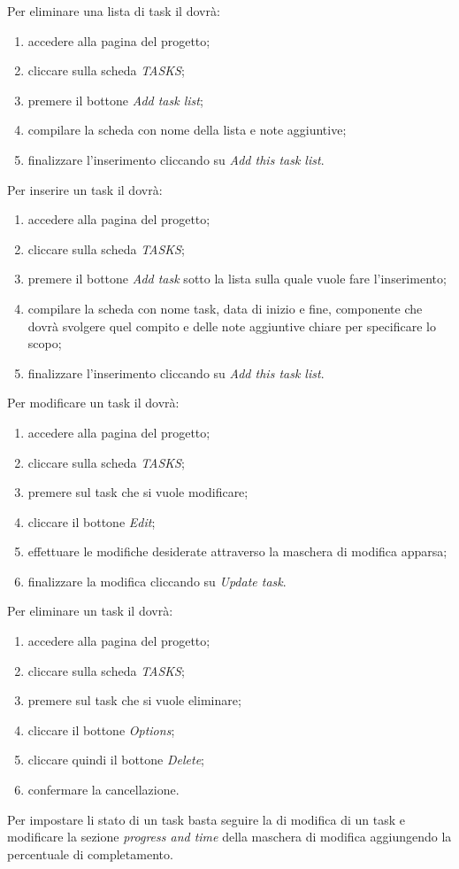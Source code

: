 			Per eliminare una lista di task il  dovrà:
			\begin{enumerate}
				\item accedere alla pagina del progetto;
				\item cliccare sulla scheda \textit{TASKS};
				\item premere il bottone \textit{Add task list};
				\item compilare la scheda con nome della lista e note aggiuntive;
				\item finalizzare l'inserimento cliccando su \textit{Add this task list}.
			\end{enumerate}
			
			Per inserire un task il  dovrà:
			\begin{enumerate}
				\item accedere alla pagina del progetto;
				\item cliccare sulla scheda \textit{TASKS};
				\item premere il bottone \textit{Add task} sotto la lista sulla quale vuole fare l'inserimento;
				\item compilare la scheda con nome task, data di inizio e fine, componente che dovrà svolgere quel compito e delle note aggiuntive chiare per specificare lo scopo;
				\item finalizzare l'inserimento cliccando su \textit{Add this task list}.
			\end{enumerate}
			
			Per modificare un task il  dovrà:
			\begin{enumerate}
				\item accedere alla pagina del progetto;
				\item cliccare sulla scheda \textit{TASKS};
				\item premere sul task che si vuole modificare;
				\item cliccare il bottone \textit{Edit};
				\item effettuare le modifiche desiderate attraverso la maschera di modifica apparsa;
				\item finalizzare la modifica cliccando su \textit{Update task}.
			\end{enumerate}
			
			Per eliminare un task il  dovrà:
			\begin{enumerate}
				\item accedere alla pagina del progetto;
				\item cliccare sulla scheda \textit{TASKS};
				\item premere sul task che si vuole eliminare;
				\item cliccare il bottone \textit{Options};
				\item cliccare quindi il bottone \textit{Delete};
				\item confermare la cancellazione.
			\end{enumerate}
			
			Per impostare li stato di un task basta  seguire la  di modifica di un task e modificare la sezione \textit{progress and time} della maschera di modifica aggiungendo la percentuale di completamento.
